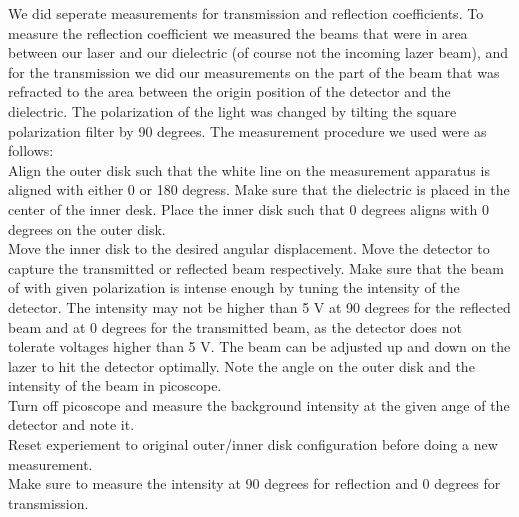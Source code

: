 We did seperate measurements for transmission and reflection coefficients. To measure the reflection coefficient we measured the beams that were in area between our laser and our dielectric (of course not the incoming lazer beam), and for the transmission we did our measurements on the part of the beam that was refracted to the area between the origin position of the detector and the dielectric. The polarization of the light was changed by tilting the square polarization filter by 90 degrees. The measurement procedure we used were as follows:\\

Align the outer disk such that the white line on the measurement apparatus is aligned with either 0 or 180 degress. Make sure that the dielectric is placed in the center of the inner desk. Place the inner disk such that 0 degrees aligns with 0 degrees on the outer disk.\\

Move the inner disk to the desired angular displacement. Move the detector to capture the transmitted or reflected beam respectively. Make sure that the beam of with given polarization is intense enough by tuning the intensity of the detector. The intensity may not be higher than 5 V at 90 degrees for the reflected beam and at 0 degrees for the transmitted beam, as the detector does not tolerate voltages higher than 5 V. The beam can be adjusted up and down on the lazer to hit the detector optimally. Note the angle on the outer disk and the intensity of the beam in picoscope.\\

Turn off picoscope and measure the background intensity at the given ange of the detector and note it.\\

Reset experiement to original outer/inner disk configuration before doing a new measurement.\\

Make sure to measure the intensity at 90 degrees for reflection and 0 degrees for transmission. 